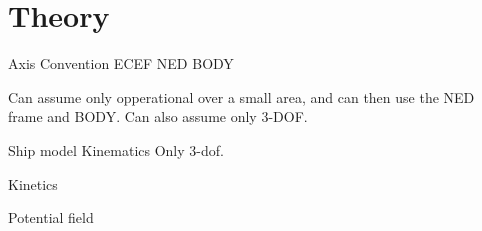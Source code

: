 
\chapter{Theory}
Axis Convention
ECEF
NED 
BODY

Can assume only opperational over a small area, and can then use the NED frame and BODY. 
Can also assume only 3-DOF. 

Ship model
    Kinematics
    Only 3-dof. 


    Kinetics
    
Potential field



\cleardoublepage